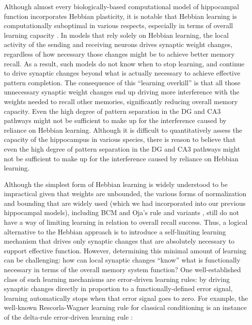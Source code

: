 \documentclass[10pt,letterpaper]{article}
\begin{document}
Although almost every biologically-based computational model of hippocampal function incorporates Hebbian plasticity, it is notable that Hebbian learning is computationally suboptimal in various respects, especially in terms of overall learning capacity \cite{Abu-MostafaSt.Jacques85,TrevesRolls91}.  In models that rely solely on Hebbian learning, the local activity of the sending and receiving neurons drives synaptic weight changes, regardless of how necessary those changes might be to achieve better memory recall.  As a result, such models do not know when to stop learning, and continue to drive synaptic changes beyond what is actually necessary to achieve effective pattern completion.  The consequence of this ``learning overkill'' is that all those unnecessary synaptic weight changes end up driving more interference with the weights needed to recall other memories, significantly reducing overall memory capacity. Even the high degree of pattern separation in the DG and CA3 pathways might not be sufficient to make up for the interference caused by reliance on Hebbian learning. Although it is difficult to quantitatively assess the capacity of the hippocampus in various species, there is reason to believe that even the high degree of pattern separation in the DG and CA3 pathways might not be sufficient to make up for the interference caused by reliance on Hebbian learning.

Although the simplest form of Hebbian learning is widely understood to be impractical given that weights are unbounded, the various forms of normalization and bounding that are widely used (which we had incorporated into our previous hippocampal models), including BCM \cite{BienenstockCooperMunro82} and Oja's rule and variants \cite{Oja89,OReillyMunakata00}, still do not have a way of limiting learning in relation to overall recall success.  Thus, a logical alternative to the Hebbian approach is to introduce a self-limiting learning mechanism that drives only synaptic changes that are absolutely necessary to support effective function.  However, determining this minimal amount of learning can be challenging: how can local synaptic changes ``know'' what is functionally necessary in terms of the overall memory system function?  One well-established class of such learning mechanisms are error-driven learning rules: by driving synaptic changes directly in proportion to a functionally-defined error signal, learning automatically stops when that error signal goes to zero. For example, the well-known Rescorla-Wagner learning rule for classical conditioning \cite{RescorlaWagner72} is an instance of the delta-rule error-driven learning rule \cite{WidrowHoff60}:
\end{document}
